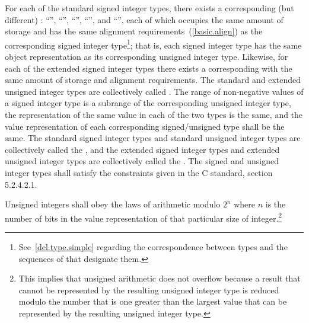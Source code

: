 \pnum
{}%
For each of the standard signed integer types,
there exists a corresponding (but different)
%
:
%
%
%
%
%
``'', ``'',
``'', ``'', and
``'', each of
which occupies the same amount of storage and has the same alignment
requirements~(\ref{basic.align}) as the corresponding signed integer
type\footnote{See~\ref{dcl.type.simple} regarding the correspondence between types and
the sequences of  that designate them.};
that is, each signed integer type has the same object representation as
its corresponding unsigned integer type.
%
%
Likewise, for each of the extended signed integer types there exists a
corresponding
 with the same amount of storage and alignment
requirements. The standard and extended unsigned integer types are
collectively called . The range of non-negative
values of a signed integer type is
a subrange of the corresponding unsigned integer type,
the representation of the same value in each of the two types is the same, and
the value representation of each corresponding signed/unsigned type shall be the same.
%
%
The standard signed integer types and standard unsigned integer types
are collectively called the , and the extended
signed integer types and extended
unsigned integer types are collectively called the
.
The signed and unsigned integer types shall satisfy
the constraints given in the C standard, section 5.2.4.2.1.

\pnum
{}%
Unsigned integers shall obey the laws of arithmetic modulo $2^n$ where $n$ is
the number of bits in the value representation of that particular size of
integer.\footnote{This implies that
unsigned arithmetic does not overflow because a result
that cannot be represented by the resulting unsigned integer type is
reduced modulo the number that is one greater than the largest value
that can be represented by the resulting unsigned integer type.}

